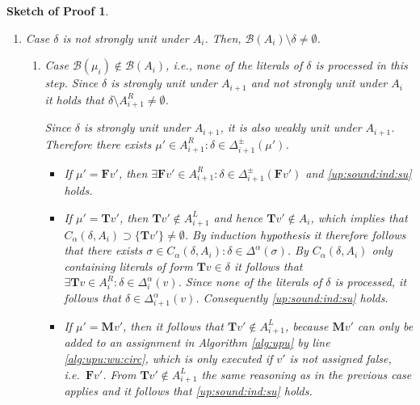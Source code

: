 \documentclass{vutinfth} %
\newtheorem{proof-sketch}{Sketch of Proof}[chapter]
\newcommand{\bass}{\mathcal{B}}
\newcommand{\bpro}{\mathcal{B}}
\newcommand{\ass}{A}
\newcommand{\bT}{\mathbf{T}}
\newcommand{\bM}{\mathbf{M}}
\newcommand{\bF}{\mathbf{F}}
\newcommand{\cdal}{C_\alpha}
\newcommand{\dpm}{\Delta^\pm}
\newcommand{\dal}{\Delta^\alpha}
\newcommand{\sgl}{\mu}
\newcommand{\bsgl}{\sigma}
\begin{document}
\begin{proof-sketch}
\begin{enumerate}
\begin{enumerate}
\begin{enumerate}
		From $\ass_{i}^R \setminus \{ \sgl_i \} \subseteq \ass_{i+1}^R$, it follows that if ${\bT v_1}, {\bF v_2}$ exist, they are in $\ass_{i+1}^R$. Also, $\delta \in \dal_i(v_1)$ implies $\delta \in \dal_{i+1}(v_1)$ and $\delta \in \dpm_i({\bF v_2})$ implies $\delta \in \dpm_{i+1}({\bF v_2})$ because $\delta$ is strongly unit and $\bpro(\sgl_i) \not \in \delta$, i.e. no algorithm will change the watches that contain $\delta$. So we have $\exists {\bT v_1} \in \ass_{i+1}^R : \delta \in \dal_{i+1}(v_1)$ or $\exists {\bF v_2} \in \ass_{i+1}^R : \delta \in \dpm_{i+1}({\bF v_2})$, i.e.~\ref{up:sound:ind:su}. %
	\end{enumerate}
	
	
	\item Case $\delta$ is not strongly unit under $A_i$. Then, $\bass(\ass_i) \setminus \delta \not = \emptyset$.


	\begin{enumerate}
		\item Case $\bpro(\sgl_i) \not \in \bass(A_i)$, i.e., none of the literals of $\delta$ is processed in this step. Since $\delta$ is strongly unit under $\ass_{i+1}$ and not strongly unit under $A_i$ it holds that $\delta \setminus \ass_{i+1}^R \not = \emptyset$.
		
		Since $\delta$ is strongly unit under $\ass_{i+1}$, it is also weakly unit under $\ass_{i+1}$. Therefore there exists $\sgl' \in \ass_{i+1}^R : \delta \in \dpm_{i+1}(\sgl')$.
		
		\begin{itemize}
			\item If $\sgl' = \bF v'$, then $\exists \bF v' \in \ass_{i+1}^R : \delta \in \dpm_{i+1}(\bF v')$ and \ref{up:sound:ind:su} holds.
			\item If $\sgl' = \bT v'$, then $\bT v' \not \in \ass_{i+1}^L$ and hence $\bT v' \not \in \ass_i$, which implies that $\cdal(\delta, \ass_i) \supset \{ \bT v' \} \not = \emptyset$. By induction hypothesis it therefore follows that there exists $\bsgl \in \cdal(\delta, \ass_i) : \delta \in \dal(\bsgl)$. By $\cdal(\delta, \ass_i)$ only containing literals of form $\bT v \in \delta$ it follows that $\exists \bT v \in \ass_i^R : \delta \in \dal_i(v)$. Since none of the literals of $\delta$ is processed, it follows that $\delta \in \dal_{i+1}(v)$. Consequently \ref{up:sound:ind:su} holds.
			\item If $\sgl' = \bM v'$, then it follows that $\bT v' \not \in \ass_{i+1}^L$, because $\bM v'$ can only be added to an assignment in Algorithm \ref{alg:upu} by line \ref{alg:upu:wu:circ}, which is only executed if $v'$ is not assigned false, i.e.~$\bF v'$. From $\bT v' \not \in \ass_{i+1}^L$ the same reasoning as in the previous case applies and it follows that \ref{up:sound:ind:su} holds.
		\end{itemize}
	

\end{enumerate}
\end{enumerate}
\end{enumerate}
\end{proof-sketch}
\end{document}

